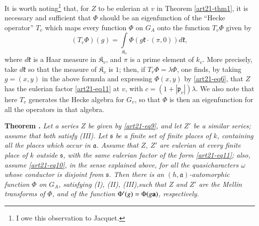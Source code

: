 It is worth noting\footnote[1]{I owe this observation to Jacquet.} that, for $Z$ to be eulerian at $v$ in Theorem \ref{art21-thm1}, it is necessary and sufficient that $\Phi$ should be an eigenfunction of the ``Hecke operator'' $T_{v}$ which maps every function $\Phi$ on $G_{A}$ onto the function $T_{v}\Phi$ given by
$$
(T_{v}\Phi)(g)=\int\limits_{\mathfrak{K}_{v}}\Phi(g\mathfrak{k}\cdot (\pi, 0))d\mathfrak{k},
$$
where $d\mathfrak{k}$ is a Haar measure in $\mathfrak{K}_{v}$, and $\pi$ is a prime element of $k_{v}$. More precisely, take $d\mathfrak{k}$ so that the measure of $\mathfrak{K}_{v}$ is $1$; then, if $T_{v}\Phi=\lambda\Phi$, one finds, by taking $g=(x,y)$ in the above formula and expressing $\Phi(x,y)$ by \eqref{art21-eq6}, that $Z$ has the eulerian factor \eqref{art21-eq11} at $v$, with $c=(1+|\mathfrak{p}_{v}|)\lambda$. We also note that here $T_{v}$ generates the Hecke algebra for $G_{v}$, so that $\Phi$ is then an eigenfunction for all the operators in that algebra.

\medskip
\noindent
{\bf Theorem .\label{art21-thm2}}
{\em Let a series $Z$ be given by \eqref{art21-eq9}, and let $Z'$ be a similar series; assume that both satisfy {\rm(III)}. Let $\mathfrak{s}$ be a finite set of finite places of $k$, containing all the places which occur in $\mathfrak{a}$. Assume that $Z$, $Z'$ are eulerian at every finite place of $k$ outside $\mathfrak{s}$, with the same eulerian factor of the form \eqref{art21-eq11}; also, assume \eqref{art21-eq10}, in the sense explained above, for all the quasicharacters $\omega$ whose conductor is disjoint from $\mathfrak{s}$. Then there is an $(h,\mathfrak{a})$-automorphic function $\Phi$ on $G_{A}$, satisfying {\rm(I), (II), (III),}\pageoriginale such that $Z$ and $Z'$ are the Mellin transforms of $\Phi$, and of the function $\Phi'(g)=\Phi(g\mathbf{a})$, respectively.}
\smallskip

